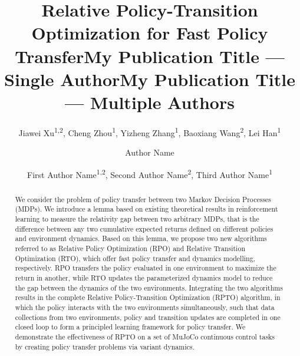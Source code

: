 \documentclass[letterpaper]{article} %
\title{Relative Policy-Transition Optimization for Fast Policy Transfer}
\author{
    Jiawei Xu\textsuperscript{\rm 1,2}\equalcontrib,
    Cheng Zhou\textsuperscript{\rm 1},
    Yizheng Zhang\textsuperscript{\rm 1},
    Baoxiang Wang\textsuperscript{\rm 2},
    Lei Han\textsuperscript{\rm 1}\equalcontrib
}
\title{My Publication Title --- Single Author}
\author {
    Author Name
}
\title{My Publication Title --- Multiple Authors}
\author {
    First Author Name\textsuperscript{\rm 1,\rm 2},
    Second Author Name\textsuperscript{\rm 2},
    Third Author Name\textsuperscript{\rm 1}
}
\begin{document}
\maketitle


\begin{abstract}

We consider the problem of policy transfer between two Markov Decision Processes (MDPs). We introduce a lemma based on existing theoretical results in reinforcement learning to measure the relativity gap between two arbitrary MDPs, that is the difference between any two cumulative expected returns defined on different policies and environment dynamics. Based on this lemma, we propose two new algorithms referred to as Relative Policy Optimization (RPO) and Relative Transition Optimization (RTO), which offer fast policy transfer and dynamics modelling, respectively. RPO transfers the policy evaluated in one environment to maximize the return in another, while RTO updates the parameterized dynamics model to reduce the gap between the dynamics of the two environments. Integrating the two algorithms results in the complete Relative Policy-Transition Optimization (RPTO) algorithm, in which the policy interacts with the two environments simultaneously, such that data collections from two environments, policy and transition updates are completed in one closed loop to form a principled learning framework for policy transfer. We demonstrate the effectiveness of RPTO on a set of MuJoCo continuous control tasks by creating policy transfer problems via variant dynamics.
\end{abstract}
\end{document}
